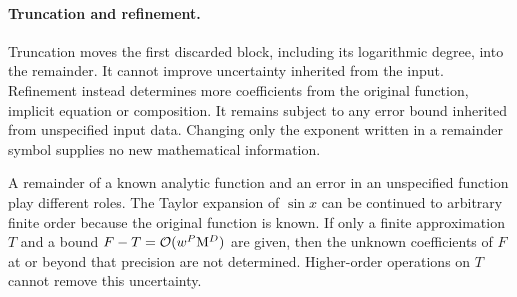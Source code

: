 \paragraph{Truncation and refinement.}
Truncation moves the first discarded block, including its logarithmic
degree, into the remainder. It cannot improve uncertainty inherited from
the input. Refinement instead determines more coefficients from the original function,
implicit equation or composition. It remains subject to any error bound
inherited from unspecified input data. Changing only the exponent written
in a remainder symbol supplies no new mathematical information.

A remainder of a known analytic function and an error in an unspecified
function play different roles. The Taylor expansion of $\sin x$ can be
continued to arbitrary finite order because the original function is known.
If only a finite approximation $T$ and a bound $F-T=\mathcal O(w^P\mathrm M^D)$ are given,
then the unknown coefficients of $F$ at or beyond that precision are not
determined. Higher-order operations on $T$ cannot remove this uncertainty.
